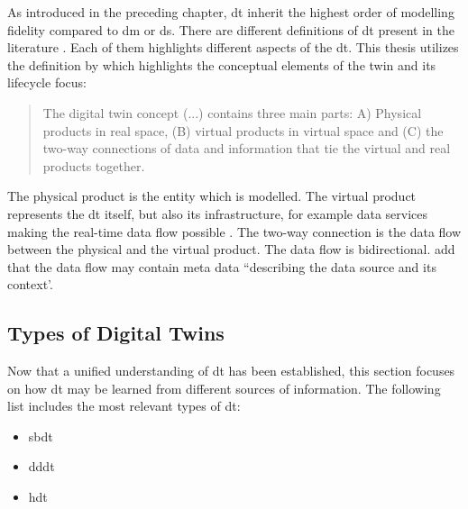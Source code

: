As introduced in the preceding chapter, \gls{dt} inherit the highest order of modelling fidelity compared to \gls{dm} or \gls{ds}. There are different definitions of \gls{dt} present in the literature \autocite{Negri2017promfg,zheng2019application,glaessgen2012digital,Demkovich2018def,boschert2016digital,grieves2014digital,kritzinger2018digital,Tao2018ijamt,zehnder2018representing}. Each of them highlights different aspects of the \gls{dt}. This thesis utilizes the definition by \textcite{grieves2014digital} which highlights the conceptual elements of the twin and its lifecycle focus:

\begin{quote}
  The digital twin concept (...) contains three main parts: A) Physical products in real space, (B) virtual products in virtual space and (C) the two-way connections of data and information that tie the virtual and real products together. \autocite{grieves2014digital}
\end{quote}

The physical product is the entity which is modelled. The virtual product represents the \gls{dt} itself, but also its infrastructure, for example data services making the real-time data flow possible \autocite{Tao2018ijamt}. The two-way connection is the data flow between the physical and the virtual product. The data flow is bidirectional. \textcite{zehnder2018representing} add that the data flow may contain meta data ``describing the data source and its context'.

\subsection*{Types of Digital Twins}
\label{sec:types-digital-twins}
Now that a unified understanding of \gls{dt} has been established, this section focuses on how \gls{dt} may be learned from different sources of information. The following list includes the most relevant types of \gls{dt}:

\begin{itemize}
  \item \gls{sbdt} \autocite{Lugaresi2021aifac,martinez2018automatic}
  \item \gls{dddt} \autocite{he2019data,Friederich2022}
  \item \gls{hdt} \autocite{luo2020hybrid,huang2023hybrid}
\end{itemize}


